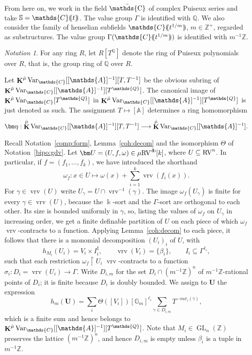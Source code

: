 \documentclass[12pt]{amsart}
\theoremstyle{plain}
\theoremstyle{definition}
\theoremstyle{remark}
\newtheorem{nota}[thm]{Notation}
\numberwithin{equation}{section}
\theoremstyle{plain}
\newcommand{\RV}{\textup{RV}}
\DeclareMathOperator{\K}{\mathds{k}}
\DeclareMathOperator{\GL}{GL}
\newcommand{\Z}{\mathds{Z}}
\newcommand{\A}{\mathds{A}}
\newcommand{\C}{\mathds{C}}
\newcommand{\G}{\mathds{G}}
\newcommand{\Q}{\mathds{Q}}
\newcommand{\0}{\emptyset}
\newcommand{\dpar}[1]{%
   (\mkern-4mu (#1 )\mkern-4mu )}
\newcommand{\rest}{\upharpoonright}
\newcommand{\fun}{\longrightarrow}
\newcommand{\efun}{\longmapsto}
\newcommand{\sub}{\subseteq}
\newcommand{\mgRV}{{\mu}{\RV}}
\DeclareMathOperator{\ggk}{\mathbf{K}}
\DeclareMathOperator{\vrv}{vrv}
\DeclareMathOperator{\db}{d \! b}
\newcommand{\var}{\textup{Var}}
\DeclareMathOperator{\puC}{\tilde \C}
\newcommand{\gmv}{\ggk^{\hat \mu}\var_{\C}}
\begin{document}
From here on, we work in the field $\puC$ of complex Puiseux series and take  $\mathbb{S} = \C \dpar{ t }$. The value group $\Gamma$ is identified with $\Q$. We also consider the family of henselian subfields $\C \dpar{ t^{1/m} }$,  $m \in \Z^+$, regarded as substructures. The value group $\Gamma(\C \dpar{ t^{1/m} })$ is identified with $m^{-1} \Z$.



\begin{nota}\label{loc:rings}
For any ring $R$, let $R[T^{\Q}]$ denote the ring of Puiseux polynomials over $R$, that is, the group ring of $\Q$ over $R$.

Let $\gmv[[\A]^{-1}][T,T^{-1}]$ be the obvious subring of $\gmv[[\A]^{-1}][T^{\Q}]$. The canonical image of $\gmv [T^{\Q}]$ in  $\gmv[[\A]^{-1}][T^{\Q}]$ is just denoted as such. The assignment $T \efun [\A]$ determines a ring homomorphism
\begin{equation}\label{pui:laurent}
  \bm \eta : \gmv[[\A]^{-1}][T,T^{-1}] \fun \gmv[[\A]^{-1}].
\end{equation}
\end{nota}


Recall Notation~\ref{comp:form}, Lemma~\ref{coh:decom} and the isomorphism $\Theta$ of Notation~\ref{bipo:gdv}. Let $\bm U = (U, f, \omega) \in \mgRV^{\db}[k]$, where $U \sub \RV^n$. In particular, if $f=(f_1,\dots,f_k)$, we have introduced the shorthand
\[
\omega_{f}: x\in U \efun \omega(x)+\sum_{i=1}^k\vrv(f_i(x)).
\]
For $\gamma \in \vrv(U)$ write $U_\gamma = U \cap \vrv^{-1}(\gamma)$. The image $\omega_f(U_\gamma)$ is finite for every $\gamma \in \vrv(U)$, because the $\K$-sort and the $\Gamma$-sort are orthogonal to each other. Its size is bounded uniformly in $\gamma$, so, listing the values of $\omega_f$ on $U_\gamma$ in increasing order, we get a finite definable partition of $U$ on each piece of which $\omega_f$ $\vrv$-contracts to a function. Applying Lemma~\ref{coh:decom} to each piece, it follows that there is a monomial decomposition $(U_i)_i$ of $U$, with
\[
h_{M_i}(U_i) = V_i \times I_i^\sharp, \qquad \vrv(V_i) = \{\beta_i\}, \qquad I_i \sub \Gamma^{\ell_i},
\]
such that each restriction $\omega_f \rest U_i$ $\vrv$-contracts to a function $\sigma_i : D_i = \vrv(U_i) \fun \Gamma$. Write $D_{i,m}$ for the set $D_i \cap (m^{-1}\Z)^n$ of  $m^{-1}\Z$-rational points of $D_i$; it is finite because $D_i$ is doubly bounded. We assign to $\bm U$ the expression
\begin{equation}\label{hm:ass}
  h_m(\bm U) = \sum_i \Theta([V_i]) [\G_m]^{\ell_i} \sum_{\gamma \in D_{i,m}} T^{-m \sigma_i(\gamma)},
\end{equation}
which is  a finite sum and hence  belongs to $\gmv[[\A]^{-1}][T^{\Q}]$. Note that $M_i \in \GL_n(\Z)$ preserves the lattice $(m^{-1}\Z)^n$, and hence $D_{i,m}$ is empty unless $\beta_i$ is a tuple in $m^{-1}\Z$.
\end{document}
